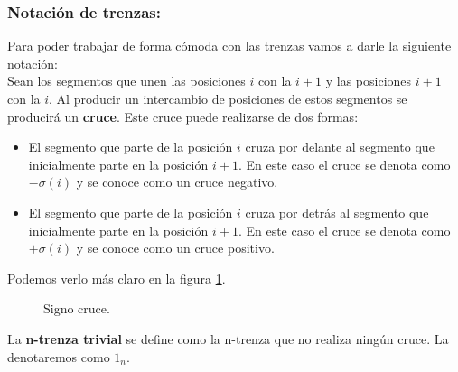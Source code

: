 \documentclass[14pt]{extarticle}
\begin{document}
 
\bigskip
\begin{center}
	\subsubsection{Notación de trenzas:}
\end{center}
Para poder trabajar de forma cómoda con las trenzas vamos a darle la siguiente notación:\\
Sean los segmentos que unen las posiciones $i$ con la $i+1$ y las posiciones $i+1$ con la $i$. Al producir un intercambio de posiciones de estos segmentos se producirá un \textbf{cruce}. Este cruce puede realizarse de dos formas: 
\begin{itemize}
	\item El segmento que parte de la posición $i$ cruza por delante al segmento que inicialmente parte en la posición $i+1$. En este caso el cruce se denota como $-\sigma(i)$ y se conoce como un cruce negativo.
	\item  El segmento que parte de la posición $i$ cruza por detrás al segmento que inicialmente parte en la posición $i+1$. En este caso el cruce se denota como $+\sigma(i)$ y se conoce como un cruce positivo.
\end{itemize}
Podemos verlo más claro en la figura \ref{tren4}.\\
   \begin{figure}[h!]
   	\centering
   	\space
   	\caption{Signo cruce.}
   	\label{tren4} 
   \end{figure}

La \textbf{n-trenza trivial} se define como la n-trenza que no realiza ningún cruce. La denotaremos como $1_{n}.$ \\
\end{document}
